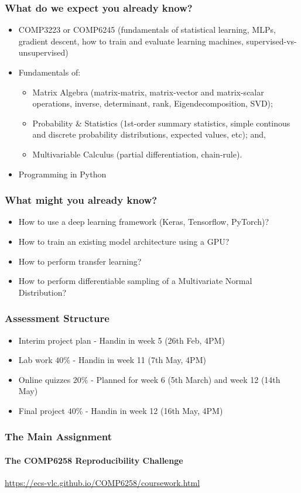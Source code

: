 \documentclass[]{article}
\begin{document}
\begin{frame}
	\frametitle{What do we expect you already know?}

	\begin{itemize}
	\item<+-> COMP3223 or COMP6245 (fundamentals of statistical learning, MLPs, gradient descent, how to train and evaluate learning machines, supervised-vs-unsupervised)
	\item<+-> Fundamentals of:
	\begin{itemize}
		\item Matrix Algebra (matrix-matrix, matrix-vector and matrix-scalar operations, inverse, determinant, rank, Eigendecomposition, SVD);
		\item Probability \& Statistics (1st-order summary statistics, simple continous and discrete probability distributions, expected values, etc); and,
		\item Multivariable Calculus (partial differentiation, chain-rule).
	\end{itemize}
	\item<+-> Programming in Python
	\end{itemize}
\end{frame}

\begin{frame}
	\frametitle{What might you already know?}
	\begin{itemize}
	\item<+-> How to use a deep learning framework (Keras, Tensorflow, PyTorch)?
	\item<+-> How to train an existing model architecture using a GPU?
	\item<+-> How to perform transfer learning?
	\item<+-> How to perform differentiable sampling of a Multivariate Normal Distribution?
	\end{itemize}
\end{frame}

\begin{frame}
	\frametitle{Assessment Structure}
	\begin{itemize}
		\item Interim project plan - Handin in week 5 (26th Feb, 4PM)
		\item Lab work $40\%$ - Handin in week 11 (7th May, 4PM)
		\item Online quizzes $20\%$ - Planned for week 6 (5th March) and week 12 (14th May)
		\item Final project $40\%$  - Handin in week 12 (16th May, 4PM)
	\end{itemize}
\end{frame}

\begin{frame}
	\frametitle{The Main Assignment}
	\framesubtitle{The COMP6258 Reproducibility Challenge}
	\url{https://ecs-vlc.github.io/COMP6258/coursework.html}
\end{frame}
\end{document}
